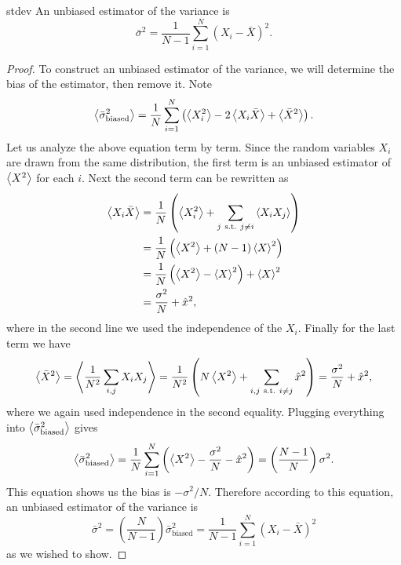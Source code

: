 \begin{proposition}{}{stdev}
  An unbiased estimator of the variance is
  $$
    \bar{\sigma}^2=\frac{1}{N-1}\sum_{i=1}^N(X_i-\bar{X})^2.
  $$
  \begin{proof}
  To construct an unbiased estimator of the variance,
  we will determine the bias of the estimator, then remove it. Note
  \begin{equation*}
    \ev{\bar{\sigma}^2_{\text{biased}}}=\frac{1}{N}\sum\limits_{i=1}^N
      \left(\ev{X_i^2}-2\ev{X_i\bar{X}}+\ev{\bar{X}^2}\right).
  \end{equation*}
  Let us analyze the above equation term by term. Since the random
  variables $X_i$ are drawn from the same distribution, the first term
  is an unbiased estimator of $\ev{X^2}$ for each $i$. Next the
  second term can be rewritten as
  \begin{equation*}
    \begin{aligned}
    \ev{X_i\bar{X}}&=\frac{1}{N}\left(\ev{X_i^2}+
                     \sum_{j\suchthat j\neq i}\ev{X_iX_j}\right)\\
                   &=\frac{1}{N}\left(\ev{X^2}+(N-1)\ev{X}^2\right)\\
                   &=\frac{1}{N}\left(\ev{X^2}-\ev{X}^2\right)+\ev{X}^2\\
                   &=\frac{\sigma^2}{N}+\hat{x}^2,
    \end{aligned}
  \end{equation*}
  where in the second line we used the independence of the $X_i$. Finally
  for the last term we have
  $$
    \ev{\bar{X}^2}=\ev{\frac{1}{N^2}\sum_{i,j}X_iX_j}
        =\frac{1}{N^2}\left(N\ev{X^2}+\sum_{i,j\suchthat i\neq j}\hat{x}^2\right)
        =\frac{\sigma^2}{N}+\hat{x}^2,
  $$
  where we again used independence in the second equality. Plugging
  everything into $\ev{\bar{\sigma}^2_{\text{biased}}}$ gives
  \begin{equation*}
      \ev{\bar{\sigma}^2_{\text{biased}}}
        =\frac{1}{N}\sum_{i=1}^N
          \left(\ev{X^2}-\frac{\sigma^2}{N}-\hat{x}^2\right)
        =\left(\frac{N-1}{N}\right)\sigma^2.
  \end{equation*}
  This equation shows us the bias is $-\sigma^2/N$. Therefore according
  to this equation, an unbiased estimator of the variance is
  $$
    \bar{\sigma}^2=\left(\frac{N}{N-1}\right)\bar{\sigma}_\text{biased}^2
                  =\frac{1}{N-1}\sum_{i=1}^N(X_i-\bar{X})^2
  $$
  as we wished to show.
  \end{proof}
\end{proposition}
